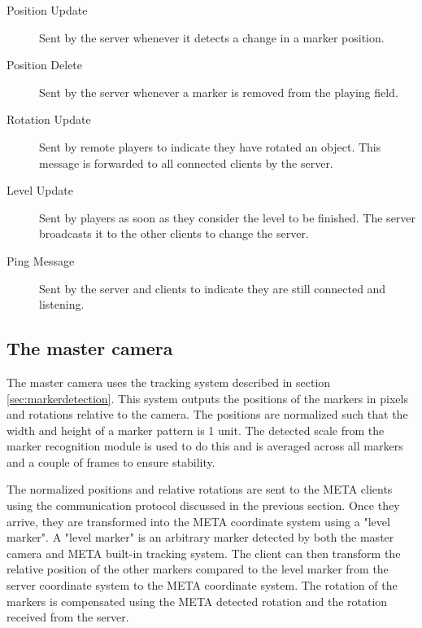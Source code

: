             \begin{description}
                \item[Position Update] Sent by the server whenever it detects a 
                                       change in a marker position.
                \item[Position Delete] Sent by the server whenever a marker is
                                       removed from the playing field.
                \item[Rotation Update] Sent by remote players to indicate they 
                                       have rotated an object. This message is 
                                       forwarded to all connected clients by the
                                       server.
\item[Level Update] Sent by players as soon as they consider the level to be finished. The server broadcasts it to the other clients to change the server.                                       
                                       
                \item[Ping Message]    Sent by the server and clients to indicate 
                                       they are still connected and listening.
                                      
            \end{description}
        
        \subsection{The master camera} \label{ssec:mastercamera}
            The master camera uses the tracking system described in section
            \ref{sec:markerdetection}. This system outputs the positions of the
            markers in pixels and rotations relative to the camera. The
            positions are normalized such that the width and height of a marker
            pattern is 1 unit. The detected scale from the marker recognition
            module is used to do this and is averaged across all markers and a
            couple of frames to ensure stability.

            The normalized positions and relative rotations are sent to the META
            clients using the communication protocol discussed in the previous
            section. Once they arrive, they are transformed into the META
            coordinate system using a "level marker". A "level marker" is an
            arbitrary marker detected by both the master camera and META
            built-in tracking system. The client can then transform the relative
            position of the other markers compared to the level marker from the
            server coordinate system to the META coordinate system. The rotation
            of the markers is compensated using the META detected rotation and
            the rotation received from the server.